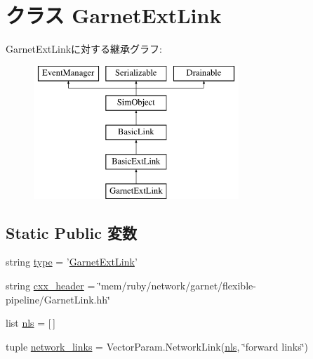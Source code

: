 \hypertarget{classGarnetLink_1_1GarnetExtLink}{
\section{クラス GarnetExtLink}
\label{classGarnetLink_1_1GarnetExtLink}
}
GarnetExtLinkに対する継承グラフ:\begin{figure}[H]
\begin{center}
\leavevmode
\includegraphics[height=5cm]{classGarnetLink_1_1GarnetExtLink}
\end{center}
\end{figure}
\subsection*{Static Public 変数}
\begin{DoxyCompactItemize}
\item 
string \hyperlink{classGarnetLink_1_1GarnetExtLink_acce15679d830831b0bbe8ebc2a60b2ca}{type} = '\hyperlink{classGarnetLink_1_1GarnetExtLink}{GarnetExtLink}'
\item 
string \hyperlink{classGarnetLink_1_1GarnetExtLink_a17da7064bc5c518791f0c891eff05fda}{cxx\_\-header} = \char`\"{}mem/ruby/network/garnet/flexible-\/pipeline/GarnetLink.hh\char`\"{}
\item 
list \hyperlink{classGarnetLink_1_1GarnetExtLink_af11789bfc44615f3244deb3cf6054da9}{nls} = \mbox{[}$\,$\mbox{]}
\item 
tuple \hyperlink{classGarnetLink_1_1GarnetExtLink_a8bbf0848b3bec491562615b151d5c318}{network\_\-links} = VectorParam.NetworkLink(\hyperlink{classGarnetLink_1_1GarnetExtLink_af11789bfc44615f3244deb3cf6054da9}{nls}, \char`\"{}forward links\char`\"{})
\end{DoxyCompactItemize}


